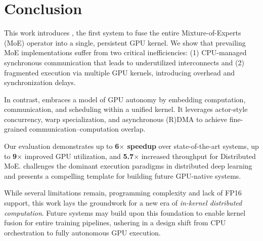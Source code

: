 \chapter{Conclusion}\label{ch:conclusion}
This work introduces \sysname,
the first system to fuse the entire Mixture-of-Experts (MoE)
operator into a single, persistent GPU kernel.
We show that prevailing MoE implementations
suffer from two critical inefficiencies:
(1) CPU-managed synchronous communication that leads to underutilized
interconnects and (2) fragmented execution via multiple GPU kernels,
introducing overhead and synchronization delays.

In contrast, \sysname embraces a model of
GPU autonomy by embedding computation, communication, and scheduling within a unified kernel.
It leverages actor-style concurrency,
warp specialization, and asynchronous (R)DMA to
achieve fine-grained communication–computation overlap.

Our evaluation demonstrates up to \textbf{6$\times$ speedup}
over state-of-the-art systems, up to \textbf{9$\times$} improved GPU utilization, and
\textbf{5.7$\times$} increased throughput for Distributed MoE\@.
\sysname challenges the dominant execution paradigms in distributed deep learning
and presents a compelling template for building future GPU-native systems.

While several limitations remain, programming complexity and lack of FP16 support, this
work lays the groundwork for a new era of \emph{in-kernel distributed computation}.
Future systems may build upon this foundation to enable kernel fusion for
entire training pipelines, ushering in a design shift from CPU orchestration to
fully autonomous GPU execution.